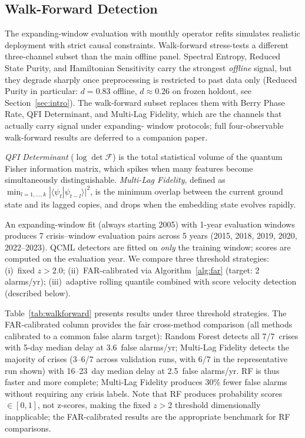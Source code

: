 \documentclass[3p]{elsarticle}
\begin{document}
\subsection{Walk-Forward Detection}\label{subsec:walkforward}

The expanding-window evaluation with monthly operator refits
simulates realistic deployment with strict causal constraints.
Walk-forward stress-tests a different three-channel subset than the
main offline panel.  Spectral Entropy, Reduced State Purity, and
Hamiltonian Sensitivity carry the strongest \emph{offline} signal,
but they degrade sharply once preprocessing is restricted to past
data only (Reduced Purity in particular: $d = 0.83$ offline,
$d \approx 0.26$ on frozen holdout, see
Section~\ref{sec:intro}).  The walk-forward subset replaces them
with Berry Phase Rate, QFI Determinant, and Multi-Lag Fidelity,
which are the channels that actually carry signal under expanding-
window protocols; full four-observable walk-forward results are
deferred to a companion paper.

\emph{QFI Determinant} ($\log\det\mathcal{F}$) is the total
statistical volume of the quantum Fisher information matrix,
which spikes when many features become simultaneously
distinguishable.  \emph{Multi-Lag Fidelity},
defined as $\min_{l=1,\ldots,k} |\langle\psi_t|\psi_{t-l}\rangle|^2$,
is the minimum overlap between the current ground state and its
lagged copies, and drops when the embedding state evolves rapidly.

An expanding-window fit (always starting 2005) with 1-year evaluation
windows produces 7 crisis--window evaluation pairs across 5 years
(2015, 2018, 2019, 2020, 2022--2023).  QCML detectors are fitted on
\emph{only} the training window; scores are computed on the evaluation
year.  We compare three threshold strategies:
(i)~fixed $z > 2.0$;
(ii)~FAR-calibrated via Algorithm~\ref{alg:far} (target: 2 alarms/yr);
(iii)~adaptive rolling quantile combined with score velocity detection
(described below).

Table~\ref{tab:walkforward} presents results under three threshold
strategies.  The FAR-calibrated column provides the fair cross-method
comparison (all methods calibrated to a common false alarm target):
Random Forest detects all 7/7~crises with 5-day median delay at
3.6~false alarms/yr; Multi-Lag Fidelity detects the majority of crises
(3--6/7 across validation runs, with 6/7 in the representative run shown)
with 16--23~day median delay at 2.5~false alarms/yr.  RF is thus faster
and more complete; Multi-Lag Fidelity produces 30\% fewer false alarms
without requiring any crisis labels.  Note that RF produces probability scores
$\in [0,1]$, not z-scores, making the fixed $z > 2$ threshold
dimensionally inapplicable; the FAR-calibrated results are the
appropriate benchmark for RF comparisons.
\end{document}
